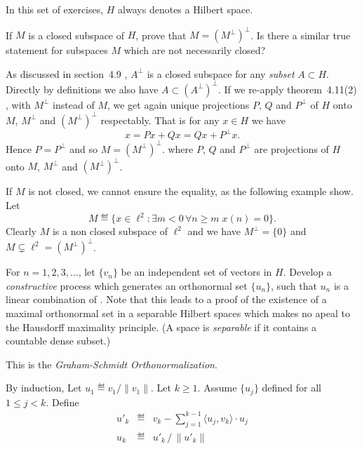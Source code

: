 In this set of exercises, $H$ always denotes a Hilbert space.

\begin{enumerate}

\begin{excopy}
If $M$ is a closed subspace of $H$, prove that
\(M = (M^\perp)^\perp\).
Is there a similar true statement for subspaces
$M$ which are not necessarily closed?
\end{excopy}

As discussed in section~4.9 \cite{RudinRCA80}, \(A^\perp\) is a closed
subspace for any \emph{subset} \(A\subset H\). Directly by definitions
we also have \(A \subset (A^\perp)^\perp\).
If we re-apply theorem~4.11(2) \cite{RudinRCA80}, with \(M^\perp\)
instead of $M$, we get again unique projections
$P$, $Q$ and \(P^\perp\)  of $H$ onto
$M$, \(M^\perp\) and \((M^\perp)^\perp\) respectably.
That is for any \(x\in H\) we have
\begin{equation*}
 x = Px + Qx = Qx + P^\perp x.
\end{equation*}
Hence \(P=P^\perp\) and so \(M = (M^\perp)^\perp\).
where $P$, $Q$ and \(P^\perp\) are projections of $H$ onto
$M$, \(M^\perp\) and \((M^\perp)^\perp\).

If $M$ is not closed, we cannot ensure the equality, as the following
example show. Let
\begin{equation*}
M \eqdef \{x\in\ell^2: \exists m < 0\,\forall n\geq m\; x(n) = 0\}.
\end{equation*}
Clearly $M$ is a non closed subspace of \(\ell^2\) and we have
\(M^\perp = \{0\}\) and
\(M \subsetneq \ell^2 = (M^\perp)^\perp\).


\begin{excopy}
For \(n=1,2,3,\ldots\), let \(\{v_n\}\) be an independent set of vectors in $H$.
Develop a \emph{constructive} process which generates an orthonormal set
\(\{u_n\}\), such that \(u_n\) is a linear combination of .
Note that this leads to a proof of the existence of a maximal orthonormal
set in a separable Hilbert spaces which makes no apeal to the Hausdorff
maximality principle.
(A space is \emph{separable}
if it contains a countable dense subset.)
\end{excopy}

This is the
\emph{Graham-Schmidt Orthonormalization}.

By induction, Let \(u_1 \eqdef v_1/\|v_1\|\).
Let \(k\geq 1\).
Assume \(\{u_j\}\) defined for all \(1\leq j < k\).
Define
\begin{eqnarray*}
 {u'}_k &\eqdef& v_k - \sum_{j=1}^{k-1} \langle u_j,v_k \rangle \cdot u_j \\
 u_k    &\eqdef& {u'}_k \,/\, \|{u'}_k\|
\end{eqnarray*}



\end{enumerate}
